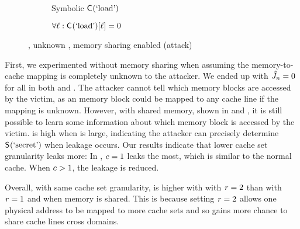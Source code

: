 \begin{figure}[t]
\begin{subfigure}[t]{0.49\columnwidth}
\resizebox{\linewidth}{!}{\protect\small}
\caption{Symbolic $\mathsf{C}_{}(\textrm{`load'})$}
\label{fig:phantom:jaccard:sharedsymload}
\end{subfigure}%
\hfill
\begin{subfigure}[t]{0.49\columnwidth}
\resizebox{\linewidth}{!}{\protect\small}
\caption{$\forall \ell: \mathsf{C}_{}(\textrm{`load'})[\ell] = 0$}
\label{fig:phantom:jaccard:flushreload}
\end{subfigure}%
\caption{, unknown ,
  memory sharing enabled (\flushreload attack)
  \label{fig:phantom:jaccard:shared}}
\end{figure}
\label{dinome:sec:cacheMitigations:random}
First, we experimented without memory sharing when assuming the
memory-to-cache mapping is completely unknown to the attacker.  We
ended up with $\hat{J}_{n}=0$ for all
\secretsSetSize in both \scatterCache and . The attacker
cannot tell which memory blocks are accessed by the victim, as an
memory block could be mapped to any cache line if the mapping is
unknown. However, with shared memory, shown in
 and
, it is still possible to
learn some information about which memory block is accessed by the
victim. \JaccardRand{\secretsSetSize} is high when \secretsSetSize is
large, indicating the attacker can precisely determine
$\mathsf{S}_{}(\textrm{`secret'})$ when leakage occurs.  Our results indicate that
lower cache set granularity leaks more: In
, $c=1$ leaks
the most, which is similar to the normal cache.  When
$c>1$, the leakage is reduced.

Overall, with same cache set granularity,
\JaccardRand{\secretsSetSize} is higher with  with
$\mathit{r}=2$ than  with $\mathit{r}=1$ and \scatterCache
when memory is shared. This is because setting $\mathit{r}=2$ allows
one physical address to be mapped to more cache sets and so gains more
chance to share cache lines cross domains.

